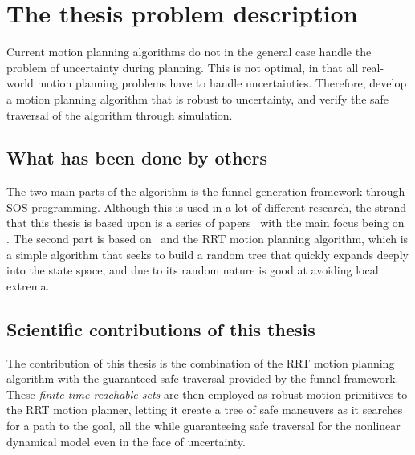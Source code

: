 \section{The thesis problem description}

Current motion planning algorithms do not in the general case handle the problem
of uncertainty during planning. This is not optimal, in that all real-world
motion planning problems have to handle uncertainties. Therefore, develop a
motion planning algorithm that is robust to uncertainty, and verify the safe
traversal of the algorithm through simulation.

\subsection{What has been done by others}

The two main parts of the \rrtfunnel{} algorithm is the funnel generation
framework through \ac{SOS} programming. Although this is used in a lot of
different research, the strand that this thesis is based upon is a series of
papers~\cite{Tobenkin_2011,tedrakeLQRtreesFeedbackMotion2009,majumdarRobustOnlineMotion2013,majumdarFunnelLibrariesRealtime2017,ahmadi2014dsos}
with the main focus being on \cite{majumdarFunnelLibrariesRealtime2017}. The
second part is based on~\textcite{article} and the \ac{RRT} motion planning
algorithm, which is a simple algorithm that seeks to build a random tree that
quickly expands deeply into the state space, and due to its random nature is
good at avoiding local extrema.

\subsection{Scientific contributions of this thesis}

The contribution of this thesis is the combination of the \ac{RRT} motion
planning algorithm with the guaranteed safe traversal provided by the funnel
framework. These \textit{finite time reachable sets} are then employed as robust
motion primitives to the \ac{RRT} motion planner, letting it create a tree of
safe maneuvers as it searches for a path to the goal, all the while guaranteeing
safe traversal for the nonlinear dynamical model even in the face of
uncertainty.
